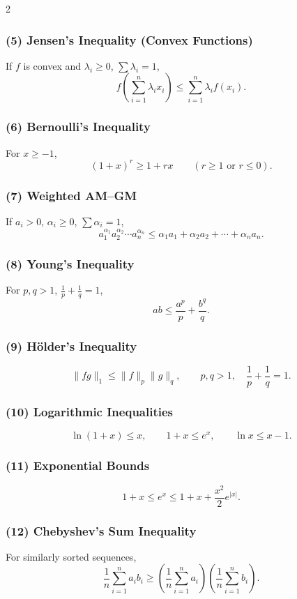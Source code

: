 \documentclass[10pt]{article}
\theoremstyle{definition}
\begin{document}
\begin{multicols*}{2}
\subsubsection*{(5) Jensen's Inequality (Convex Functions)}
If \(f\) is convex and \(\lambda_i \ge 0\), \(\sum \lambda_i = 1\),
\[
f\!\left(\sum_{i=1}^n \lambda_i x_i\right)
\le
\sum_{i=1}^n \lambda_i f(x_i).
\]

\subsubsection*{(6) Bernoulli's Inequality}
For \(x \ge -1\),
\[
(1+x)^r \ge 1 + rx
\qquad (r \ge 1 \text{ or } r \le 0).
\]

\subsubsection*{(7) Weighted AM--GM}
If \(a_i > 0\), \(\alpha_i \ge 0\), \(\sum\alpha_i = 1\),
\[
a_1^{\alpha_1} a_2^{\alpha_2}\cdots a_n^{\alpha_n}
\le
\alpha_1 a_1 + \alpha_2 a_2 + \cdots + \alpha_n a_n.
\]

\subsubsection*{(8) Young's Inequality}
For \(p,q>1\), \(\tfrac{1}{p}+\tfrac{1}{q}=1\),
\[
ab \le \frac{a^p}{p} + \frac{b^q}{q}.
\]

\subsubsection*{(9) Hölder's Inequality}
\[
\|fg\|_1 \le \|f\|_p \|g\|_q,
\qquad
p,q>1,\quad \frac{1}{p}+\frac{1}{q}=1.
\]

\subsubsection*{(10) Logarithmic Inequalities}
\[
\ln(1+x)\le x,\qquad
1+x \le e^x,\qquad
\ln x \le x-1.
\]

\subsubsection*{(11) Exponential Bounds}
\[
1+x \le e^x \le 1 + x + \frac{x^2}{2}e^{|x|}.
\]

\subsubsection*{(12) Chebyshev's Sum Inequality}
For similarly sorted sequences,
\[
\frac{1}{n}\sum_{i=1}^n a_i b_i
\ge
\left(\frac{1}{n}\sum_{i=1}^n a_i\right)
\left(\frac{1}{n}\sum_{i=1}^n b_i\right).
\]


\end{multicols*}
\end{document}
